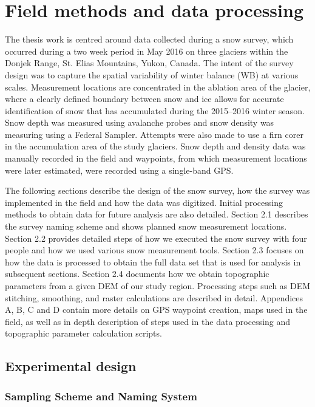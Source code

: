 \documentclass{sfuthesis}
\begin{document}
\chapter{Field methods and data processing}

The thesis work is centred around data collected during a snow survey, which occurred during a two week period in May 2016 on three glaciers within the Donjek Range, St. Elias Mountains, Yukon, Canada. The intent of the survey design was to capture the spatial variability of winter balance (WB) at various scales. Measurement locations are concentrated in the ablation area of the glacier, where a clearly defined boundary between snow and ice allows for accurate identification of snow that has accumulated during the 2015--2016 winter season. Snow depth was measured using avalanche probes and snow density was measuring using a Federal Sampler. Attempts were also made to use a firn corer in the accumulation area of the study glaciers. Snow depth and density data was manually recorded in the field and waypoints, from which measurement locations were later estimated, were recorded using a single-band GPS. 

The following sections describe the design of the snow survey, how the survey was implemented in the field and how the data was digitized. Initial processing methods to obtain data for future analysis are also detailed. Section 2.1 describes the survey naming scheme and shows planned snow measurement locations. Section 2.2 provides detailed steps of how we executed the snow survey with four people and how we used various snow measurement tools. Section 2.3 focuses on how the data is processed to obtain the full data set that is used for analysis in subsequent sections. Section 2.4 documents how we obtain topographic parameters from a given DEM of our study region. Processing steps such as DEM stitching, smoothing, and raster calculations are described in detail. Appendices A, B, C and D contain more details on GPS waypoint creation, maps used in the field, as well as in depth description of steps used in the data processing and topographic parameter calculation scripts. 

\section{Experimental design}
\label{sec:FieldDesign}

\subsection{Sampling Scheme and Naming System}
\end{document}
